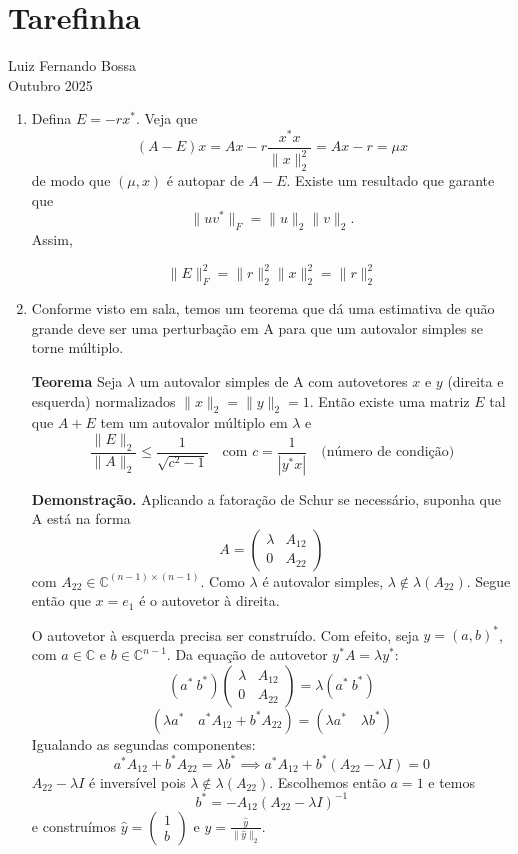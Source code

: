 \documentclass[a4paper,12pt]{article}
\begin{document}
\section*{Tarefinha}
\begin{center}
    Luiz Fernando Bossa\\ Outubro 2025
\end{center}

\begin{enumerate}
    \item[\textcircled{1}] Defina $E = -rx^*$. Veja que
    \[
    (A - E)x = Ax - r\frac{x^*x}{\|x\|_2^2} = Ax - r = \mu x
    \]
    de modo que $(\mu, x)$ é autopar de $A - E$. 
    Existe um resultado que garante que 
    $$\|uv^*\|_F = \|u\|_2 \|v\|_2.$$ Assim,
    
    \[
    \|E\|_F^2 = \|r\|_2^2 \|x\|_2^2 = \|r\|_2^2
    \]

    \item[\textcircled{2}] 
Conforme visto em sala, temos um teorema que dá uma estimativa de quão grande deve ser uma perturbação em A para que um autovalor simples se torne múltiplo.

\textbf{Teorema} Seja $\lambda$ um autovalor simples de A com autovetores $x$ e $y$ (direita e esquerda) normalizados $\|x\|_2 = \|y\|_2 = 1$. Então existe uma matriz $E$ tal que $A+E$ tem um autovalor múltiplo em $\lambda$ e
\[ \frac{\|E\|_2}{\|A\|_2} \le \frac{1}{\sqrt{c^2-1}} \quad \text{com } c = \frac{1}{|y^*x|} \quad \text{(número de condição)} \]

\medskip 

\textbf{Demonstração.} Aplicando a fatoração de Schur se necessário, suponha que A está na forma
\[ A = \begin{pmatrix} \lambda & A_{12} \\ 0 & A_{22} \end{pmatrix} \]
com $A_{22} \in \mathbb{C}^{(n-1) \times (n-1)}$.
Como $\lambda$ é autovalor simples, $\lambda \notin \lambda(A_{22})$.
Segue então que $x=e_1$ é o autovetor à direita. 

O autovetor à esquerda precisa ser construído. Com efeito, seja $y = (a, b)^*$, com $a \in \mathbb{C}$ e $b \in \mathbb{C}^{n-1}$.
Da equação de autovetor $y^*A = \lambda y^*$:
\[ (a^* \ b^*) \begin{pmatrix} \lambda & A_{12} \\ 0 & A_{22} \end{pmatrix} = \lambda (a^* \ b^*) \]
\[ (\lambda a^* \quad a^*A_{12} + b^*A_{22}) = (\lambda a^* \quad \lambda b^*) \]
Igualando as segundas componentes:
\[ a^*A_{12} + b^*A_{22} = \lambda b^* \implies a^*A_{12} + b^*(A_{22} - \lambda I) = 0 \]
$A_{22} - \lambda I$ é inversível pois $\lambda \notin \lambda(A_{22})$.
Escolhemos então $a=1$ e temos
\[ b^* = -A_{12}(A_{22} - \lambda I)^{-1} \]
e construímos $\hat{y} = \begin{pmatrix} 1 \\ b \end{pmatrix}$ e $y = \frac{\hat{y}}{\|\hat{y}\|_2}$.


\end{enumerate}
\end{document}
